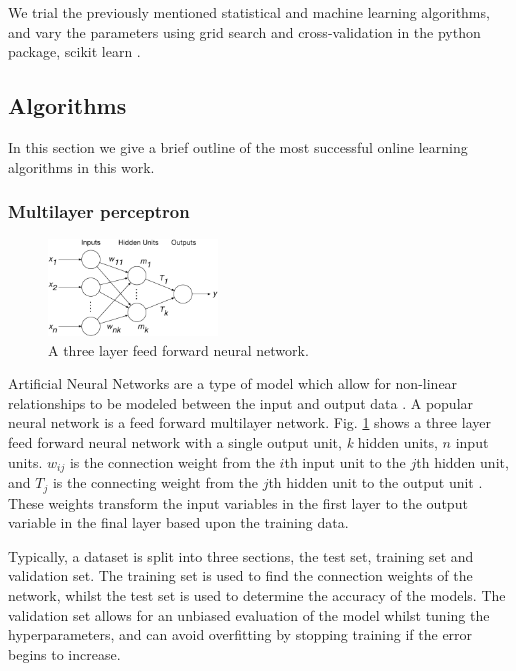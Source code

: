 \documentclass[final,3p,times,twocolumn,numbers]{elsarticle}
\begin{document}
We trial the previously mentioned statistical and machine learning algorithms, and vary the parameters using grid search and cross-validation in the python package, scikit learn \cite{scikit-learn}.

\subsection{Algorithms}

In this section we give a brief outline of the most successful online learning algorithms in this work.

\subsubsection{Multilayer perceptron}


\begin{figure}
	\includegraphics[width=0.4\textwidth]{figures/methods/Kell_eEnergy_Fig1.eps}
	\caption{A three layer feed forward neural network.}
	\label{fig:mlp}
\end{figure}

Artificial Neural Networks are a type of model which allow for non-linear relationships to be modeled between the input and output data \cite{Akaike1974}. A popular neural network is a feed forward multilayer network. Fig. \ref{fig:mlp} shows a three layer feed forward neural network with a single output unit, \textit{k} hidden units, $n$ input units. $w_{ij}$ is the connection weight from the $i$th input unit to the $j$th hidden unit,  and $T_j$ is the connecting weight from the $j$th hidden unit to the output unit \cite{Pao2007}. These weights transform the input variables in the first layer to the output variable in the final layer based upon the training data. 

Typically, a dataset is split into three sections, the test set, training set and validation set. The training set is used to find the connection weights of the network, whilst the test set is used to determine the accuracy of the models. The validation set allows for an unbiased evaluation of the model whilst tuning the hyperparameters, and can avoid overfitting by stopping training if the error begins to increase.
\end{document}
